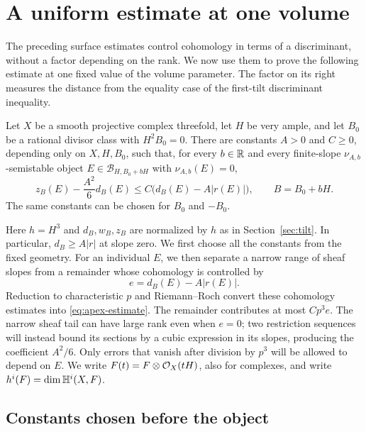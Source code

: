 \section{A uniform estimate at one volume}\label{sec:apex}

The preceding surface estimates control cohomology in terms of a
discriminant, without a factor depending on the rank.  We now use them to
prove the following estimate at one fixed value of the volume parameter.
The factor on its right measures the distance from the equality case of
the first-tilt discriminant inequality.

\begin{proposition}\label{prop:apex}
Let $X$ be a smooth projective complex threefold, let $H$ be very ample,
and let $B_0$ be a rational divisor class with $H^2B_0=0$.
There are constants $A>0$ and $C\geq0$, depending only on $X,H,B_0$,
such that, for every $b\in\mathbb R$ and every finite-slope
$\nu_{A,b}$-semistable object $E\in\mathcal B_{H,B_0+bH}$
with $\nu_{A,b}(E)=0$,
\begin{equation}\label{eq:apex-estimate}
 z_B(E)-\frac{A^2}{6}d_B(E)
 \leq C\bigl(d_B(E)-A|r(E)|\bigr),\qquad B=B_0+bH.
\end{equation}
The same constants can be chosen for $B_0$ and $-B_0$.
\end{proposition}

Here $h=H^3$ and $d_B,w_B,z_B$ are normalized by $h$ as in
Section~\ref{sec:tilt}.  In particular, $d_B\geq A|r|$ at slope zero.
We first choose all the constants from the fixed geometry.  For an
individual $E$, we then separate a narrow range of sheaf slopes from a
remainder whose cohomology is controlled by
\[
 e=d_B(E)-A|r(E)|.
\]
Reduction to characteristic $p$ and Riemann--Roch convert these
cohomology estimates into \eqref{eq:apex-estimate}.  The remainder
contributes at most $Cp^3e$.  The narrow sheaf tail can have large
rank even when $e=0$; two restriction sequences will instead bound
its sections by a cubic expression in its slopes, producing the
coefficient $A^2/6$.  Only errors that vanish after division by
$p^3$ will be allowed to depend on $E$.
We write $F(t)=F\otimes\mathcal O_X(tH)$, also for complexes, and write
$h^i(F)=\dim\mathbb H^i(X,F)$.

\subsection{Constants chosen before the object}

